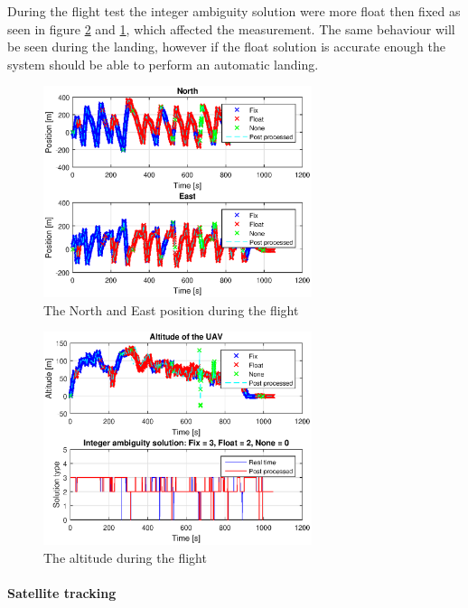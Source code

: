 During the flight test the integer ambiguity solution were more float then fixed as seen in figure \ref{figure:DownFlight} and \ref{figure:NorthEastFlight}, which affected the measurement. The same behaviour will be seen during the landing, however if the float solution is accurate enough the system should be able to perform an automatic landing.
\begin{figure}[H]
	\centering
		\includegraphics[width=0.7\textwidth]{figs/plots/northEastFlight.eps}
		\caption{The North and East position during the flight}
		\label{figure:NorthEastFlight}
\end{figure}
\begin{figure}[H]
	\centering
		\includegraphics[width=0.7\textwidth]{figs/plots/AltitudeFlight.eps}
		\caption{The altitude during the flight}
		\label{figure:DownFlight}
\end{figure}
\paragraph{Satellite tracking}

